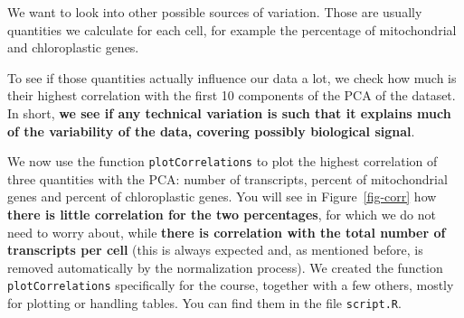 \documentclass[
  letterpaper,
  DIV=11,
  numbers=noendperiod]{scrartcl}
\begin{document}
We want to look into other possible sources of variation. Those are
usually quantities we calculate for each cell, for example the
percentage of mitochondrial and chloroplastic genes.

To see if those quantities actually influence our data a lot, we check
how much is their highest correlation with the first 10 components of
the PCA of the dataset. In short, \textbf{we see if any technical
variation is such that it explains much of the variability of the data,
covering possibly biological signal}.

We now use the function \texttt{plotCorrelations} to plot the highest
correlation of three quantities with the PCA: number of transcripts,
percent of mitochondrial genes and percent of chloroplastic genes. You
will see in Figure~\ref{fig-corr} how \textbf{there is little
correlation for the two percentages}, for which we do not need to worry
about, while \textbf{there is correlation with the total number of
transcripts per cell} (this is always expected and, as mentioned before,
is removed automatically by the normalization process). We created the
function \texttt{plotCorrelations} specifically for the course, together
with a few others, mostly for plotting or handling tables. You can find
them in the file \texttt{script.R}.
\end{document}
